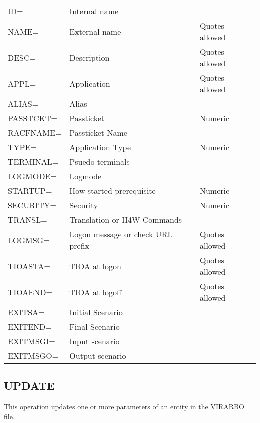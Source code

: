 \documentclass[letterpaper,10pt,english]{sphinxmanual}
\begin{document}
\begin{savenotes}\sphinxattablestart
\centering
\begin{tabulary}{\linewidth}[t]{|T|T|T|}
\hline
{}\relax &\relax &\relax \\
\hline
ID=
&
Internal name
&\\
\hline
NAME=
&
External name
&
Quotes allowed
\\
\hline
DESC=
&
Description
&
Quotes allowed
\\
\hline
APPL=
&
Application
&
Quotes allowed
\\
\hline
ALIAS=
&
Alias
&\\
\hline
PASSTCKT=
&
Passticket
&
Numeric
\\
\hline
RACFNAME=
&
Passticket Name
&\\
\hline
TYPE=
&
Application Type
&
Numeric
\\
\hline
TERMINAL=
&
Psuedo-terminals
&\\
\hline
LOGMODE=
&
Logmode
&\\
\hline
STARTUP=
&
How started
prerequisite
&
Numeric
\\
\hline
SECURITY=
&
Security
&
Numeric
\\
\hline
TRANSL=
&
Translation or H4W
Commands
&\\
\hline
LOGMSG=
&
Logon message or
check URL prefix
&
Quotes allowed
\\
\hline
TIOASTA=
&
TIOA at logon
&
Quotes allowed
\\
\hline
TIOAEND=
&
TIOA at logoff
&
Quotes allowed
\\
\hline
EXITSA=
&
Initial Scenario
&\\
\hline
EXITEND=
&
Final Scenario
&\\
\hline
EXITMSGI=
&
Input scenario
&\\
\hline
EXITMSGO=
&
Output scenario
&\\
\hline
\end{tabulary}
\par
\sphinxattableend\end{savenotes}


\subsection{UPDATE}
\label{\detokenize{Installation_Guide:update}}\label{\detokenize{Installation_Guide:index-175}}
This operation updates one or more parameters of an entity in the VIRARBO file.
\end{document}
